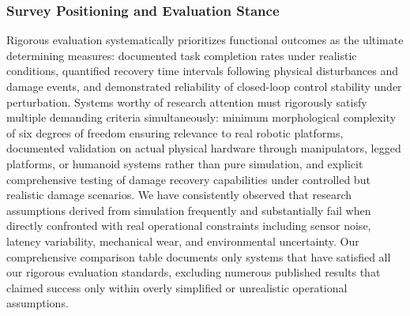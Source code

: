 ﻿\documentclass[11pt,a4paper]{article}
\begin{document}
\subsubsection{Survey Positioning and Evaluation Stance}
Rigorous evaluation systematically prioritizes functional outcomes as the ultimate determining measures: documented task completion rates under realistic conditions, quantified recovery time intervals following physical disturbances and damage events, and demonstrated reliability of closed-loop control stability under perturbation. Systems worthy of research attention must rigorously satisfy multiple demanding criteria simultaneously: minimum morphological complexity of six degrees of freedom ensuring relevance to real robotic platforms, documented validation on actual physical hardware through manipulators, legged platforms, or humanoid systems rather than pure simulation, and explicit comprehensive testing of damage recovery capabilities under controlled but realistic damage scenarios. We have consistently observed that research assumptions derived from simulation frequently and substantially fail when directly confronted with real operational constraints including sensor noise, latency variability, mechanical wear, and environmental uncertainty. Our comprehensive comparison table documents only systems that have satisfied all our rigorous evaluation standards, excluding numerous published results that claimed success only within overly simplified or unrealistic operational assumptions.
\end{document}
